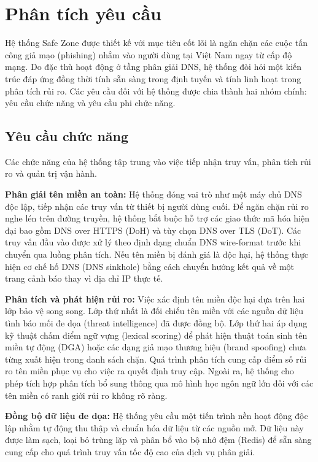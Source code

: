 \section{Phân tích yêu cầu}

Hệ thống Safe Zone được thiết kế với mục tiêu cốt lõi là ngăn chặn các cuộc tấn công giả mạo (phishing) nhắm vào người dùng tại Việt Nam ngay từ cấp độ mạng. Do đặc thù hoạt động ở tầng phân giải DNS, hệ thống đòi hỏi một kiến trúc đáp ứng đồng thời tính sẵn sàng trong định tuyến và tính linh hoạt trong phân tích rủi ro. Các yêu cầu đối với hệ thống được chia thành hai nhóm chính: yêu cầu chức năng và yêu cầu phi chức năng.

\subsection{Yêu cầu chức năng}

Các chức năng của hệ thống tập trung vào việc tiếp nhận truy vấn, phân tích rủi ro và quản trị vận hành.

\textbf{Phân giải tên miền an toàn:}
Hệ thống đóng vai trò như một máy chủ DNS độc lập, tiếp nhận các truy vấn từ thiết bị người dùng cuối. Để ngăn chặn rủi ro nghe lén trên đường truyền, hệ thống bắt buộc hỗ trợ các giao thức mã hóa hiện đại bao gồm DNS over HTTPS (DoH) và tùy chọn DNS over TLS (DoT). Các truy vấn đầu vào được xử lý theo định dạng chuẩn DNS wire-format trước khi chuyển qua luồng phân tích. Nếu tên miền bị đánh giá là độc hại, hệ thống thực hiện cơ chế hố DNS (DNS sinkhole) bằng cách chuyển hướng kết quả về một trang cảnh báo thay vì địa chỉ IP thực tế.

\textbf{Phân tích và phát hiện rủi ro:}
Việc xác định tên miền độc hại dựa trên hai lớp bảo vệ song song. Lớp thứ nhất là đối chiếu tên miền với các nguồn dữ liệu tình báo mối đe dọa (threat intelligence) đã được đồng bộ. Lớp thứ hai áp dụng kỹ thuật chấm điểm ngữ vựng (lexical scoring) để phát hiện thuật toán sinh tên miền tự động (DGA) hoặc các dạng giả mạo thương hiệu (brand spoofing) chưa từng xuất hiện trong danh sách chặn. Quá trình phân tích cung cấp điểm số rủi ro tên miền phục vụ cho việc ra quyết định truy cập. Ngoài ra, hệ thống cho phép tích hợp phân tích bổ sung thông qua mô hình học ngôn ngữ lớn đối với các tên miền có ranh giới rủi ro không rõ ràng.

\textbf{Đồng bộ dữ liệu đe dọa:}
Hệ thống yêu cầu một tiến trình nền hoạt động độc lập nhằm tự động thu thập và chuẩn hóa dữ liệu từ các nguồn mở. Dữ liệu này được làm sạch, loại bỏ trùng lặp và phân bổ vào bộ nhớ đệm (Redis) để sẵn sàng cung cấp cho quá trình truy vấn tốc độ cao của dịch vụ phân giải.


